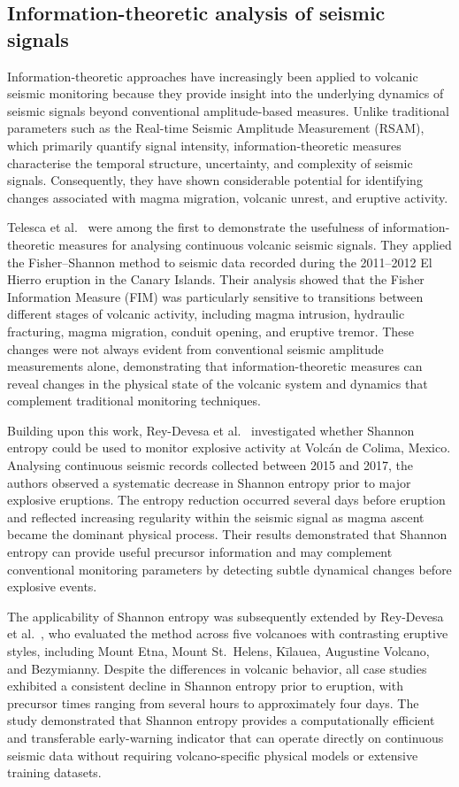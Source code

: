 \documentclass[12pt,a4paper]{article}
\begin{document}
\subsection{Information-theoretic analysis of seismic signals}

Information-theoretic approaches have increasingly been applied to volcanic seismic monitoring because they provide insight into the underlying dynamics of seismic signals beyond conventional amplitude-based measures. Unlike traditional parameters such as the Real-time Seismic Amplitude Measurement (RSAM), which primarily quantify signal intensity, information-theoretic measures characterise the temporal structure, uncertainty, and complexity of seismic signals. Consequently, they have shown considerable potential for identifying changes associated with magma migration, volcanic unrest, and eruptive activity.

Telesca et al.~\cite{Telesca2014} were among the first to demonstrate the usefulness of information-theoretic measures for analysing continuous volcanic seismic signals. They applied the Fisher--Shannon method to seismic data recorded during the 2011--2012 El Hierro eruption in the Canary Islands. Their analysis showed that the Fisher Information Measure (FIM) was particularly sensitive to transitions between different stages of volcanic activity, including magma intrusion, hydraulic fracturing, magma migration, conduit opening, and eruptive tremor. These changes were not always evident from conventional seismic amplitude measurements alone, demonstrating that information-theoretic measures can reveal changes in the physical state of the volcanic system and dynamics that complement traditional monitoring techniques.

Building upon this work, Rey-Devesa et al.~\cite{ReyDevesa2023} investigated whether Shannon entropy could be used to monitor explosive activity at Volc\'an de Colima, Mexico. Analysing continuous seismic records collected between 2015 and 2017, the authors observed a systematic decrease in Shannon entropy prior to major explosive eruptions. The entropy reduction occurred several days before eruption and reflected increasing regularity within the seismic signal as magma ascent became the dominant physical process. Their results demonstrated that Shannon entropy can provide useful precursor information and may complement conventional monitoring parameters by detecting subtle dynamical changes before explosive events.

The applicability of Shannon entropy was subsequently extended by Rey-Devesa et al.~\cite{ReyDevesa2023JGR}, who evaluated the method across five volcanoes with contrasting eruptive styles, including Mount Etna, Mount St.~Helens, Kīlauea, Augustine Volcano, and Bezymianny. Despite the differences in volcanic behavior, all case studies exhibited a consistent decline in Shannon entropy prior to eruption, with precursor times ranging from several hours to approximately four days. The study demonstrated that Shannon entropy provides a computationally efficient and transferable early-warning indicator that can operate directly on continuous seismic data without requiring volcano-specific physical models or extensive training datasets.
\end{document}
